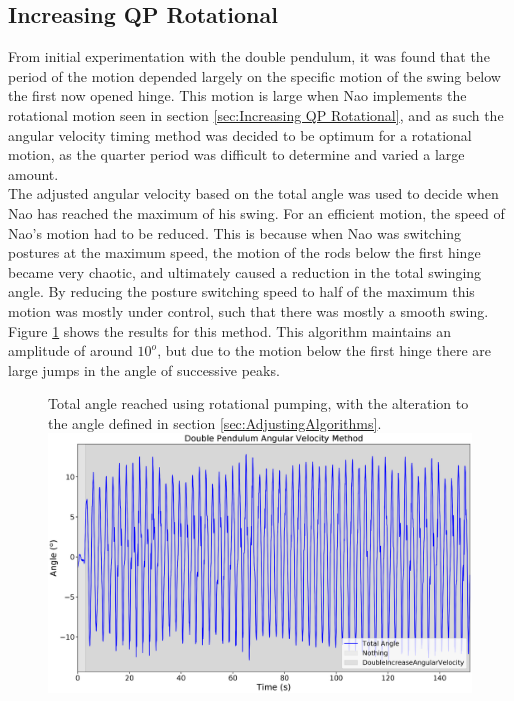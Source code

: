 \documentclass[11pt]{article}
\begin{document}
\clearpage

\subsection{Increasing QP Rotational}
From initial experimentation with the double pendulum, it was found that the period of the motion depended largely on the specific motion of the swing below the first now opened hinge. This motion is large when Nao implements the rotational motion seen in section \ref{sec:Increasing QP Rotational}, and as such the angular velocity timing method was decided to be optimum for a rotational motion, as the quarter period was difficult to determine and varied a large amount.\\

The adjusted angular velocity based on the total angle was used to decide when Nao has reached the maximum of his swing. For an efficient motion, the speed of Nao's motion had to be reduced. This is because when Nao was switching postures at the maximum speed, the motion of the rods below the first hinge became very chaotic, and ultimately caused a reduction in the total swinging angle. By reducing the posture switching speed to half of the maximum this motion was mostly under control, such that there was mostly a smooth swing.\\

Figure \ref{fig:DoublePendulumData3} shows the results for this method. This algorithm maintains an amplitude of around $10^o$, but due to the motion below the first hinge there are large jumps in the angle of successive peaks.

    \begin{figure}[!htb]
        \centering
        \captionbox
             {Total angle reached using rotational pumping, with the alteration to the angle defined in section \ref{sec:AdjustingAlgorithms}.\label{fig:DoublePendulumData3}}
             {\includegraphics[width=1.0\textwidth]{DoublePendulumRotationalAngular.eps}}
    \end{figure}
\end{document}
